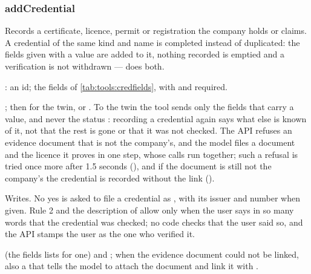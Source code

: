 \subsubsection{addCredential}\label{sec:tools:addCredential}
\begin{description}[style=multiline, leftmargin=19mm, labelwidth=17mm, labelsep=2mm,
  font=\sffamily\bfseries\footnotesize\color{ink}, itemsep=1pt, topsep=2pt, before=\raggedright]
  \item[Does] Records a certificate, licence, permit or registration the company holds or
    claims. A credential of the same kind and name is completed instead of duplicated: the
    fields given with a value are added to it, nothing recorded is emptied and a verification
    is not withdrawn ---  does both.
  \item[Input] : an id; the fields of \cref{tab:tools:credfields}, with
     and  required.
  \item[Calls] ; then
     for the twin, or
    . To the twin the tool sends only the fields
    that carry a value, and never the status : recording a credential again says
    what else is known of it, not that the rest is gone or that it was not checked. The API
    refuses an evidence document that is not the company's, and the model files a document and
    the licence it proves in one step, whose calls run together; such a refusal is tried once
    more after 1.5 seconds (), and if the document is still not the
    company's the credential is recorded without the link ().
  \item[Kind] Writes. No yes is asked to file a credential as , with its
    issuer and number when given. Rule 2 and the description of  allow
     only when the user says in so many words that the credential was
    checked; no code checks that the user said so, and the API stamps the user as the one
    who verified it.
  \item[Returns]  (the fields  lists for one) and
    ; when the evidence document could not be linked, also a
     that tells the model to attach the document and link it with
    .
\end{description}

